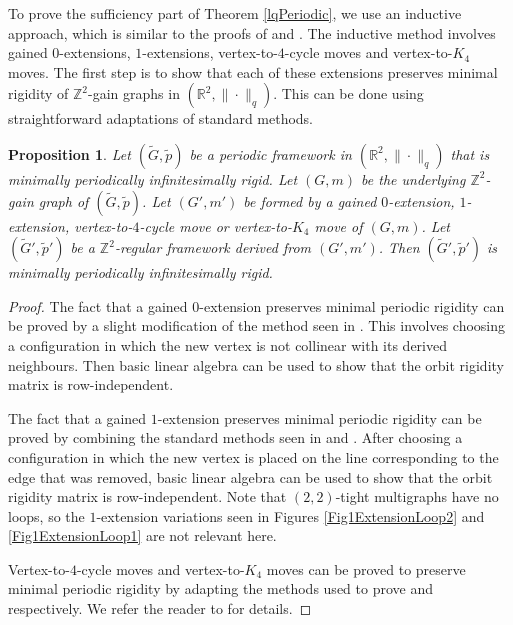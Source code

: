 \documentclass[reqno,a4paper,10pt]{article}
\newtheorem{proposition}[theorem]{Proposition}
\theoremstyle{definition}
\theoremstyle{remark}
\numberwithin{equation}{section}
\numberwithin{figure}{section}
\numberwithin{table}{section}
\newcommand{\R}{\mathbb{R}}
\newcommand{\Z}{\mathbb{Z}}
\newcommand{\G}{\tilde{G}}
\newcommand{\p}{\tilde{p}}
\begin{document}
    To prove the sufficiency part of Theorem \ref{lqPeriodic}, we use an inductive approach, which is similar to the proofs of \cite[Theorem 3.6]{NonEuclidean} and \cite[Theorem 5.1]{Inductive}. The inductive method involves gained $0$-extensions, $1$-extensions, vertex-to-$4$-cycle moves and vertex-to-$K_4$ moves. The first step is to show that each of these extensions preserves minimal rigidity of $\Z^2$-gain graphs in $(\R^2,\|\cdot\|_q)$. This can be done using straightforward adaptations of standard  methods.
    \begin{proposition}\label{PeriodicLqExtensions}
		Let $(\G,\p)$ be a periodic framework in $(\R^2,\|\cdot\|_q)$ that is minimally periodically infinitesimally rigid. Let $(G,m)$ be the underlying $\Z^2$-gain graph of $(\G,\p)$. Let $(G',m')$ be formed by a gained $0$-extension, $1$-extension, vertex-to-$4$-cycle move or vertex-to-$K_4$ move of $(G,m)$. Let $(\G',\p')$ be a $\Z^2$-regular framework derived from $(G',m')$. Then $(\G',\p')$ is minimally periodically infinitesimally rigid.
	\end{proposition}
    \begin{proof}
        The fact that a gained $0$-extension preserves minimal periodic rigidity can be proved by a slight modification of the method seen in \cite[Lemma 3.8]{NonEuclidean}. This involves choosing a configuration in which the new vertex is not collinear with its derived neighbours. Then basic linear algebra can be used to show that the orbit rigidity matrix is row-independent.

        The fact that a gained $1$-extension preserves minimal periodic rigidity can be proved by combining the standard methods seen in \cite[Lemma 3.10]{NonEuclidean} and \cite[Proposition 3.2]{Inductive}. After choosing a configuration in which the new vertex is placed on the line corresponding to the edge that was removed, basic linear algebra can be used to show that the orbit rigidity matrix is row-independent. Note that $(2,2)$-tight multigraphs have no loops, so the $1$-extension variations seen in Figures \ref{Fig1ExtensionLoop2} and \ref{Fig1ExtensionLoop1} are not relevant here.

        Vertex-to-$4$-cycle moves and vertex-to-$K_4$ moves can be proved to preserve minimal periodic rigidity by adapting the methods used to prove \cite[Lemma 3.12]{NonEuclidean} and \cite[Lemma 3.14]{NonEuclidean} respectively. We refer the reader to \cite{EssonThesis} for details.
    \end{proof}
\end{document}
